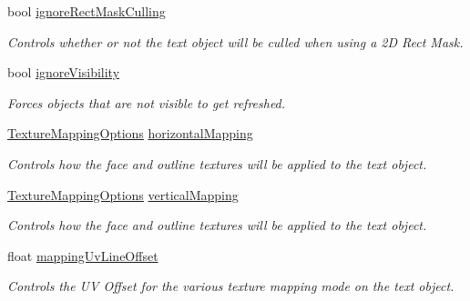 \begin{DoxyCompactItemize}
bool \mbox{\hyperlink{class_t_m_pro_1_1_t_m_p___text_ae26a7d66454f3871e5668b0585c0735a}{ignore\+Rect\+Mask\+Culling}}
\begin{DoxyCompactList}\small\item\em Controls whether or not the text object will be culled when using a 2D Rect Mask. \end{DoxyCompactList}\item 
bool \mbox{\hyperlink{class_t_m_pro_1_1_t_m_p___text_aff917246ee0ede7464a316dffd728149}{ignore\+Visibility}}
\begin{DoxyCompactList}\small\item\em Forces objects that are not visible to get refreshed. \end{DoxyCompactList}\item 
\mbox{\hyperlink{namespace_t_m_pro_ab5c7877e6f736cba8b501c877bf5b612}{Texture\+Mapping\+Options}} \mbox{\hyperlink{class_t_m_pro_1_1_t_m_p___text_ae63cc778cd7e6deeee029bcec94fd674}{horizontal\+Mapping}}
\begin{DoxyCompactList}\small\item\em Controls how the face and outline textures will be applied to the text object. \end{DoxyCompactList}\item 
\mbox{\hyperlink{namespace_t_m_pro_ab5c7877e6f736cba8b501c877bf5b612}{Texture\+Mapping\+Options}} \mbox{\hyperlink{class_t_m_pro_1_1_t_m_p___text_acd761b8efd2cdbd37d3d288d9609df94}{vertical\+Mapping}}
\begin{DoxyCompactList}\small\item\em Controls how the face and outline textures will be applied to the text object. \end{DoxyCompactList}\item 
float \mbox{\hyperlink{class_t_m_pro_1_1_t_m_p___text_a09c20ff5fa1b5a03b0c9d996449668da}{mapping\+Uv\+Line\+Offset}}
\begin{DoxyCompactList}\small\item\em Controls the UV Offset for the various texture mapping mode on the text object. \end{DoxyCompactList}\item 

\end{DoxyCompactItemize}
